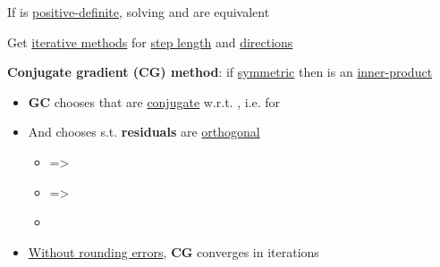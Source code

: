 If  is \underline{positive-definite}, solving  and
are equivalent


Get \underline{iterative methods}
for \underline{step length}  and \underline{directions} 

\hSep %

\textbf{Conjugate gradient (CG) method}: if  \underline{symmetric} then
is an \underline{inner-product}
\begin{itemize}

      \item
            \textbf{GC} chooses  that are \underline{conjugate}
            w.r.t. ,
            i.e. 
            for 
      \item
            And chooses  s.t. \textbf{residuals}
            are \underline{orthogonal}

            \begin{itemize}

                  \item
                         =>
                  \item
                         =>
                  \item
            \end{itemize}
      \item
            \underline{Without rounding errors}, \textbf{CG} converges in  iterations
            \tcbbreak


\end{itemize}
